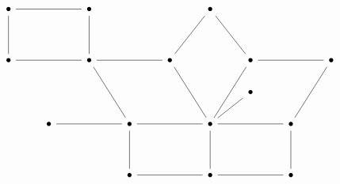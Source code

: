 \[\begin{tikzcd}
	{} \\
	&& \bullet && \bullet &&& \bullet \\
	\\
	&& \bullet && \bullet && \bullet && \bullet && \bullet \\
	&&&&&& {} && \bullet \\
	&&& \bullet && \bullet && \bullet && \bullet \\
	\\
	&&&&& \bullet && \bullet && \bullet
	\arrow[no head, from=4-5, to=4-7]
	\arrow[no head, from=4-7, to=2-8]
	\arrow[no head, from=2-8, to=4-9]
	\arrow[no head, from=4-9, to=4-11]
	\arrow[no head, from=6-8, to=4-9]
	\arrow[no head, from=6-10, to=4-11]
	\arrow[no head, from=4-7, to=6-8]
	\arrow[no head, from=6-6, to=6-8]
	\arrow[no head, from=4-5, to=4-3]
	\arrow[no head, from=4-3, to=2-3]
	\arrow[no head, from=2-3, to=2-5]
	\arrow[no head, from=2-5, to=4-5]
	\arrow[no head, from=8-8, to=8-10]
	\arrow[no head, from=8-10, to=6-10]
	\arrow[no head, from=6-6, to=8-6]
	\arrow[no head, from=8-6, to=8-8]
	\arrow[no head, from=6-8, to=5-9]
	\arrow[no head, from=6-8, to=8-8]
	\arrow[no head, from=6-8, to=6-10]
	\arrow[no head, from=6-6, to=6-4]
	\arrow[no head, from=4-5, to=6-6]
\end{tikzcd}\]